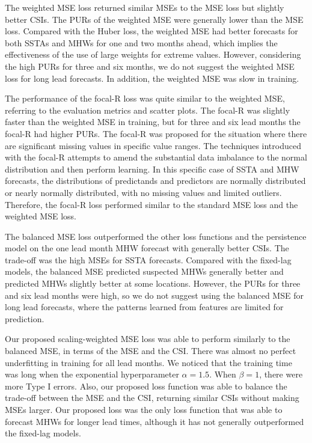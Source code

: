 \documentclass[11pt, a4paper]{article}
\begin{document}
The weighted MSE loss returned similar MSEs to the MSE loss but slightly better CSIs. The PURs of the weighted MSE were generally lower than the MSE loss. Compared with the Huber loss, the weighted MSE had better forecasts for both SSTAs and MHWs for one and two months ahead, which implies the effectiveness of the use of large weights for extreme values. However, considering the high PURs for three and six months, we do not suggest the weighted MSE loss for long lead forecasts. In addition, the weighted MSE was slow in training.

The performance of the focal-R loss was quite similar to the weighted MSE, referring to the evaluation metrics and scatter plots. The focal-R was slightly faster than the weighted MSE in training, but for three and six lead months the focal-R had higher PURs. The focal-R was proposed for the situation where there are significant missing values in specific value ranges. The techniques introduced with the focal-R \citep{yang2021delving} attempts to amend the substantial data imbalance to the normal distribution and then perform learning. In this specific case of SSTA and MHW forecasts, the distributions of predictands and predictors are normally distributed or nearly normally distributed, with no missing values and limited outliers. Therefore, the focal-R loss performed similar to the standard MSE loss and the weighted MSE loss.

The balanced MSE loss outperformed the other loss functions and the persistence model on the one lead month MHW forecast with generally better CSIs. The trade-off was the high MSEs for SSTA forecasts. Compared with the fixed-lag models, the balanced MSE predicted suspected MHWs generally better and predicted MHWs slightly better at some locations. However, the PURs for three and six lead months were high, so we do not suggest using the balanced MSE for long lead forecasts, where the patterns learned from features are limited for prediction.

Our proposed scaling-weighted MSE loss was able to perform similarly to the balanced MSE, in terms of the MSE and the CSI. There was almost no perfect underfitting in training for all lead months. We noticed that the training time was long when the exponential hyperparameter $\alpha=1.5$. When $\beta=1$, there were more Type I errors. Also, our proposed loss function was able to balance the trade-off between the MSE and the CSI, returning similar CSIs without making MSEs larger. Our proposed loss was the only loss function that was able to forecast MHWs for longer lead times, although it has not generally outperformed the fixed-lag models.
\end{document}

